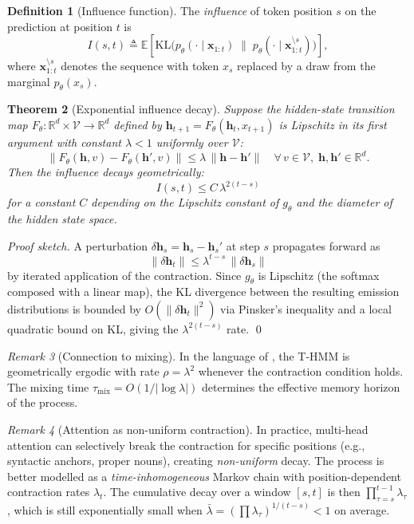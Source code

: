 \documentclass[11pt,a4paper]{article}
\theoremstyle{plain}
\newtheorem{theorem}{Theorem}[section]
\theoremstyle{definition}
\newtheorem{definition}[theorem]{Definition}
\theoremstyle{remark}
\newtheorem{remark}[theorem]{Remark}
\newcommand{\R}{\mathbb{R}}
\newcommand{\E}{\mathbb{E}}
\newcommand{\KL}{\mathrm{KL}}
\newcommand{\vocab}{\mathcal{V}}
\begin{document}
\begin{definition}[Influence function]
The \emph{influence} of token position $s$ on the prediction at position $t$ is
\[
  I(s, t) \triangleq
  \E\!\left[\KL\!\Big(
    p_\theta(\cdot \mid \bm{x}_{1:t})
    \;\Big\|\;
    p_\theta(\cdot \mid \bm{x}_{1:t}^{\setminus s})
  \Big)\right],
\]
where $\bm{x}_{1:t}^{\setminus s}$ denotes the sequence with token $x_s$
replaced by a draw from the marginal $p_\theta(x_s)$.
\end{definition}

\begin{theorem}[Exponential influence decay]\label{thm:decay}
Suppose the hidden-state transition map $F_\theta: \R^d \times \vocab \to \R^d$
defined by $\bm{h}_{t+1} = F_\theta(\bm{h}_t, x_{t+1})$ is Lipschitz in its
first argument with constant $\lambda < 1$ uniformly over $\vocab$:
\[
  \|F_\theta(\bm{h}, v) - F_\theta(\bm{h}', v)\| \leq \lambda\, \|\bm{h} - \bm{h}'\|
  \quad \forall\, v \in \vocab,\; \bm{h}, \bm{h}' \in \R^d.
\]
Then the influence decays geometrically:
\[
  I(s, t) \leq C\, \lambda^{2(t-s)}
\]
for a constant $C$ depending on the Lipschitz constant of $g_\theta$ and the
diameter of the hidden state space.
\end{theorem}

\begin{proof}[Proof sketch]
A perturbation $\delta \bm{h}_s = \bm{h}_s - \bm{h}_s'$ at step $s$ propagates
forward as
\[
  \|\delta \bm{h}_t\| \leq \lambda^{t-s}\, \|\delta \bm{h}_s\|
\]
by iterated application of the contraction. Since $g_\theta$ is Lipschitz (the
softmax composed with a linear map), the KL divergence between the resulting
emission distributions is bounded by $O(\|\delta \bm{h}_t\|^2)$ via Pinsker's
inequality and a local quadratic bound on KL, giving the $\lambda^{2(t-s)}$
rate. \qed
\end{proof}

\begin{remark}[Connection to mixing]
In the language of , the T-HMM is geometrically ergodic
with rate $\rho = \lambda^2$ whenever the contraction condition holds. The
mixing time $\tau_{\mathrm{mix}} = O(1/|\log \lambda|)$ determines the
effective memory horizon of the process.
\end{remark}

\begin{remark}[Attention as non-uniform contraction]
In practice, multi-head attention can selectively break the contraction for
specific positions (e.g., syntactic anchors, proper nouns), creating
\emph{non-uniform} decay. The process is better modelled as a
\emph{time-inhomogeneous} Markov chain with position-dependent contraction
rates $\lambda_t$. The cumulative decay over a window $[s, t]$ is then
$\prod_{\tau=s}^{t-1} \lambda_\tau$, which is still exponentially small when
$\bar{\lambda} = (\prod \lambda_\tau)^{1/(t-s)} < 1$ on average.
\end{remark}
\end{document}
